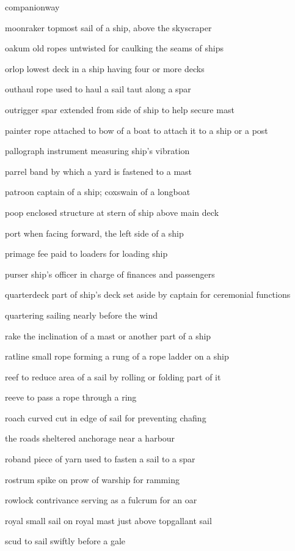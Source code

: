 \documentclass[
  11pt,
  msmallroyalvopaper
]{memoir}
\begin{document}
\begin{labeling}{companionway}
\item[moonraker]
topmost sail of a ship, above the skyscraper
\item[oakum]
old ropes untwisted for caulking the seams of ships
\item[orlop]
lowest deck in a ship having four or more decks
\item[outhaul]
rope used to haul a sail taut along a spar
\item[outrigger]
spar extended from side of ship to help secure mast
\item[painter]
rope attached to bow of a boat to attach it to a ship or a post
\item[pallograph]
instrument measuring ship's vibration
\item[parrel]
band by which a yard is fastened to a mast
\item[patroon]
captain of a ship; coxswain of a longboat
\item[poop]
enclosed structure at stern of ship above main deck
\item[port]
when facing forward, the left side of a ship
\item[primage]
fee paid to loaders for loading ship
\item[purser]
ship's officer in charge of finances and passengers
\item[quarterdeck]
part of ship's deck set aside by captain for ceremonial functions
\item[quartering]
sailing nearly before the wind
\item[rake]
the inclination of a mast or another part of a ship
\item[ratline]
small rope forming a rung of a rope ladder on a ship
\item[reef]
to reduce area of a sail by rolling or folding part of it
\item[reeve]
to pass a rope through a ring
\item[roach]
curved cut in edge of sail for preventing chafing
\item[the roads]
sheltered anchorage near a harbour
\item[roband]
piece of yarn used to fasten a sail to a spar
\item[rostrum]
spike on prow of warship for ramming
\item[rowlock]
contrivance serving as a fulcrum for an oar
\item[royal]
small sail on royal mast just above topgallant sail
\item[scud]
to sail swiftly before a gale

\end{labeling}
\end{document}
